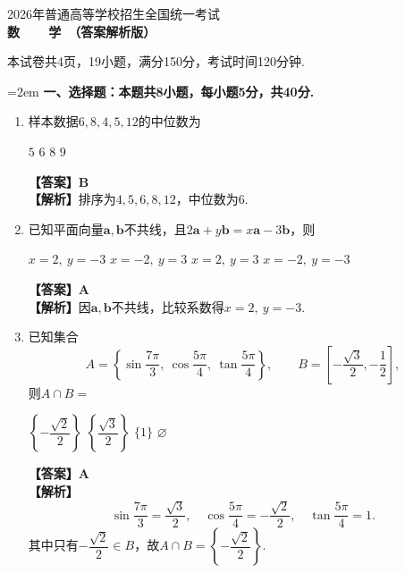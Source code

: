 \documentclass[12pt,a4paper]{article}
\begin{document}
	
	\vspace*{0.5cm}
	
	\begin{center}
		{\Large 2026年普通高等学校招生全国统一考试}\\[0.8cm]
		{\LARGE\bfseries 数~~~~学\ （答案解析版）}
	\end{center}
	
	\noindent 本试卷共4页，19小题，满分150分，考试时间120分钟.
	
	\vspace{0.3cm}
	
	\noindent\hangindent=2em {\bfseries 一、选择题：本题共8小题，每小题5分，共40分.}
	
	\begin{enumerate}[leftmargin=*,label=\arabic*.,itemsep=0.8ex]
		
		\item 样本数据$6,8,4,5,12$的中位数为
		\begin{choicesFour}
			\choice $5$ \choice $6$ \choice $8$ \choice $9$
		\end{choicesFour}
		\textbf{【答案】B}\\
		\textbf{【解析】}排序为$4,5,6,8,12$，中位数为$6$.
		
		\item 已知平面向量$\boldsymbol{a},\boldsymbol{b}$不共线，且$2\boldsymbol{a}+y\boldsymbol{b}=x\boldsymbol{a}-3\boldsymbol{b}$，则
		\begin{choicesFour}
			\choice $x=2,\ y=-3$ \choice $x=-2,\ y=3$ \choice $x=2,\ y=3$ \choice $x=-2,\ y=-3$
		\end{choicesFour}
		\textbf{【答案】A}\\
		\textbf{【解析】}因$\boldsymbol a,\boldsymbol b$不共线，比较系数得$x=2,\ y=-3$.
		
		\item 已知集合
		\[
		A=\left\{\sin\frac{7\pi}{3},\ \cos\frac{5\pi}{4},\ \tan\frac{5\pi}{4}\right\},\qquad
		B=\left[-\frac{\sqrt3}{2},-\frac12\right],
		\]
		则$A\cap B=$
		\begin{choicesFour}
			\choice $\left\{-\dfrac{\sqrt2}{2}\right\}$
			\choice $\left\{\dfrac{\sqrt3}{2}\right\}$
			\choice $\{1\}$
			\choice $\varnothing$
		\end{choicesFour}
		\textbf{【答案】A}\\
		\textbf{【解析】}
		\[
		\sin\frac{7\pi}{3}=\frac{\sqrt3}{2},\quad
		\cos\frac{5\pi}{4}=-\frac{\sqrt2}{2},\quad
		\tan\frac{5\pi}{4}=1.
		\]
		其中只有$-\dfrac{\sqrt2}{2}\in B$，故$A\cap B=\left\{-\dfrac{\sqrt2}{2}\right\}$.
		

\end{enumerate}
\end{document}
